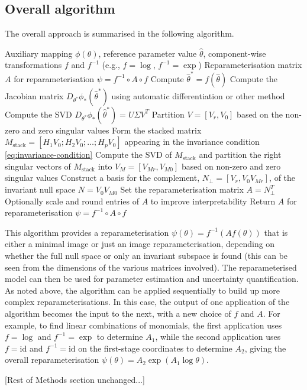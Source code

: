 \subsection{Overall algorithm}
The overall approach is summarised in the following algorithm.
\begin{algorithm}[H]
\caption{Numerical reparameterisation algorithm}
\label{alg:reparam}
\begin{algorithmic}[1]
\Input Auxiliary mapping $\phi(\theta)$, reference parameter value $\hat{\theta}$, component-wise transformations $f$ and $f^{-1}$ (e.g., $f=\log$, $f^{-1}=\exp$)
\Output Reparameterisation matrix $A$ for reparameterisation $\psi = f^{-1} \circ A \circ f$
\State Compute $\hat{\theta}^* = f(\hat{\theta})$
\State Compute the Jacobian matrix $D_{\theta^*}\phi_*(\hat{\theta}^*)$ using automatic differentiation or other method
\State Compute the SVD $D_{\theta^*}\phi_*(\hat{\theta}^*) = U\Sigma V^T$
\State Partition $V=[V_r, V_0]$ based on the non-zero and zero singular values
\State Form the stacked matrix $M_{\text{stack}} = [H_1 V_0; H_2 V_0; \dots; H_p V_0]$ appearing in the invariance condition \eqref{eq:invariance-condition}
\State Compute the SVD of $M_{\text{stack}}$ and partition the right singular vectors of $M_{\text{stack}}$ into $V_M=[V_{Mr}, V_{M0}]$ based on non-zero and zero singular values
\State Construct a basis for the complement, $N_{\perp} = [V_r, V_0V_{Mr}]$, of the invariant null space $N = V_0V_{M0}$
\State Set the reparameterisation matrix $A = N_{\perp}^T$
\State Optionally scale and round entries of $A$ to improve interpretability
\State Return $A$ for reparameterisation $\psi = f^{-1} \circ A \circ f$
\end{algorithmic}
\end{algorithm}
This algorithm provides a reparameterisation $\psi(\theta) = f^{-1} (A f(\theta))$ that is either a minimal image or just an image reparameterisation, depending on whether the full null space or only an invariant subspace is found (this can be seen from the dimensions of the various matrices involved). The reparameterised model can then be used for parameter estimation and uncertainty quantification. As noted above, the algorithm can be applied sequentially to build up more complex reparameterisations. In this case, the output of one application of the algorithm becomes the input to the next, with a new choice of $f$ and $A$. For example, to find linear combinations of monomials, the first application uses $f=\log$ and $f^{-1}=\exp$ to determine $A_1$, while the second application uses $f=\text{id}$ and $f^{-1}=\text{id}$ on the first-stage coordinates to determine $A_2$, giving the overall reparameterisation $\psi(\theta) = A_2 \exp(A_1 \log \theta)$.

[Rest of Methods section unchanged...]

